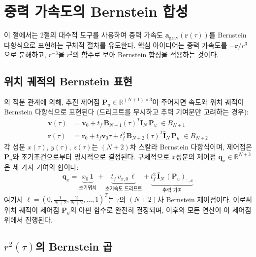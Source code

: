 \documentclass[11pt]{article}
\begin{document}
\section{중력 가속도의 Bernstein 합성}
\label{sec:gravity}

이 절에서는 2절의 대수적 도구를 사용하여
중력 가속도 $\mathbf{a}_\mathrm{grav}(\mathbf{r}(\tau))$를
Bernstein 다항식으로 표현하는 구체적 절차를 유도한다.
핵심 아이디어는 중력 가속도를 $-\mathbf{r} / r^3$으로 분해하고,
$r^{-3}$을 $r^2$의 함수로 보아 Bernstein 합성을 적용하는 것이다.

\subsection{위치 궤적의 Bernstein 표현}

\cite{report004}의 적분 관계에 의해,
추진 제어점 $\mathbf{P}_u \in \mathbb{R}^{(N+1) \times 3}$이 주어지면
속도와 위치 궤적이 Bernstein 다항식으로 표현된다
(드리프트를 무시하고 추력 기여분만 고려하는 경우):
\begin{align}
  \mathbf{v}(\tau) &= \mathbf{v}_0 + t_f \, \mathbf{B}_{N+1}(\tau)^T \mathbf{I}_N \, \mathbf{P}_u
    \;\in B_{N+1}
  \label{eq:v-bernstein} \\
  \mathbf{r}(\tau) &= \mathbf{r}_0 + t_f \mathbf{v}_0 \tau
    + t_f^2 \, \mathbf{B}_{N+2}(\tau)^T \bar{\mathbf{I}}_N \, \mathbf{P}_u
    \;\in B_{N+2}
  \label{eq:r-bernstein}
\end{align}
각 성분 $x(\tau)$, $y(\tau)$, $z(\tau)$는 $(N{+}2)$차 스칼라 Bernstein 다항식이며,
제어점은 $\mathbf{P}_u$와 초기조건으로부터 명시적으로 결정된다.
구체적으로 $x$성분의 제어점 $\mathbf{q}_x \in \mathbb{R}^{N+3}$은
세 가지 기여의 합이다:
\begin{equation}
  \mathbf{q}_x
  = \underbrace{x_0 \, \mathbf{1}}_{\text{초기위치}}
  + \underbrace{t_f \, v_{x,0}\, \boldsymbol{\ell}}_{\text{초기속도 드리프트}}
  + \underbrace{t_f^2 \, \bar{\mathbf{I}}_N \, (\mathbf{P}_u)_{:,x}}_{\text{추력 기여}}
  \label{eq:qx}
\end{equation}
여기서 $\boldsymbol{\ell} = (0, \frac{1}{N+2}, \frac{2}{N+2}, \ldots, 1)^T$는
$\tau$의 $(N{+}2)$차 Bernstein 제어점이다.
이로써 위치 궤적이 제어점 $\mathbf{P}_u$의 아핀 함수로 완전히 결정되며,
이후의 모든 연산이 이 제어점 위에서 진행된다.

\subsection{$r^2(\tau)$의 Bernstein 곱}
\end{document}
